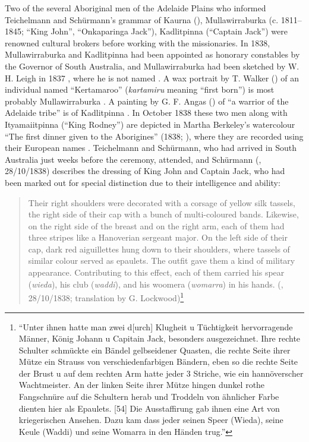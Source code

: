 Two of the several Aboriginal men of the Adelaide Plains who informed Teichelmann and Schürmann’s grammar of Kaurna (), Mulla\-wirra\-burka (c. 1811--1845; “King John”, “Onkaparinga Jack”), Kadlitpinna (“Captain Jack”) were renowned cultural brokers before working with the missionaries. In 1838, Mullawirraburka and Kadlitpinna had been appointed as honorary constables by the Governor of South Australia, and Mullawirraburka had been sketched by W. H. Leigh in 1837 \citep[91]{Gara1998}, where he is not named \citep[84–88]{Leigh1839}. A wax portrait by T. Walker () of an individual named “Kertamaroo” (\textit{kartamiru} meaning “first born”) is most probably Mullawirraburka \citep[92]{Gara1998}. A painting by G. F. Angas () of “a warrior of the Adelaide tribe” is of Kadlitpinna \citep[96]{Gara1998}. In October 1838 these two men along with Ityamaiitpinna (“King Rodney”) are depicted in Martha Berkeley’s watercolour ``The first dinner given to the Aborigines'' (1838; ), where they are recorded using their European names \citep[60]{Hylton2012}. Teichelmann and Schürmann, who had arrived in South Australia just weeks before the ceremony, attended, and Schürmann (\citeyear{schurmann_diaries_1838}, 28/10/1838) describes the dressing of King John and Captain Jack, who had been marked out for special distinction due to their intelligence and ability:

\begin{quote}
    Their right shoulders were decorated with a corsage of yellow silk tassels, the right side of their cap with a bunch of multi-coloured bands.  Likewise, on the right side of the breast and on the right arm, each of them had three stripes like a Hanoverian sergeant major.  On the left side of their cap, dark red aiguillettes hung down to their shoulders, where tassels of similar colour served as epaulets. The outfit gave them a kind of military appearance.  Contributing to this effect, each of them carried his spear (\textit{wieda}), his club (\textit{waddi}), and his woomera (\textit{womarra}) in his hands. (\citealt{schurmann_diaries_1838}, 28/10/1838; translation by G. Lockwood)\footnote{ ``Unter ihnen hatte man zwei d[urch] Klugheit u Tüchtigkeit hervorragende Männer, König Johann u Capitain Jack, besonders ausgezeichnet.  Ihre rechte Schulter schmückte ein Bändel gelbseidener Quasten, die rechte Seite ihrer Mütze ein Strauss von verschiedenfarbigen Bändern, eben so die rechte Seite der Brust u auf dem rechten Arm hatte jeder 3 Striche, wie ein hannöverscher Wachtmeister.  An der linken Seite ihrer Mütze hingen dunkel rothe Fangschnüre auf die Schultern herab und Troddeln von ähnlicher Farbe dienten hier als Epaulets. [54] Die Ausstaffirung gab ihnen eine Art von kriegerischen Ansehen.  Dazu kam dass jeder seinen Speer (Wieda), seine Keule (Waddi) und seine Womarra in den Händen trug.''} 
\end{quote}




